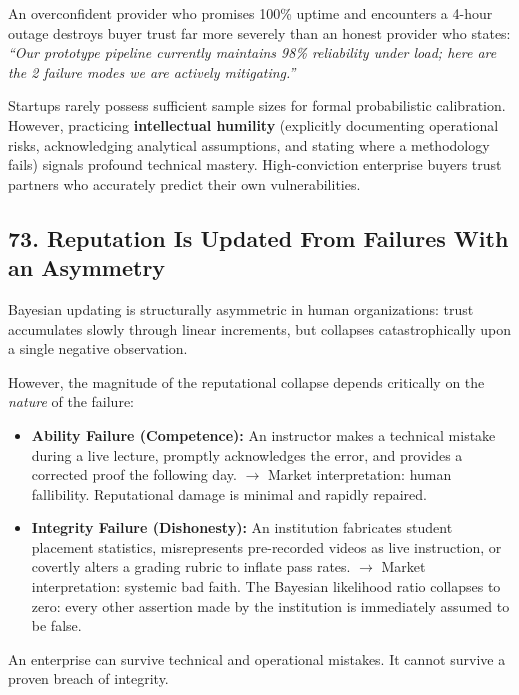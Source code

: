 An overconfident provider who promises 100\% uptime and encounters a 4-hour outage destroys buyer trust far more severely than an honest provider who states: \emph{``Our prototype pipeline currently maintains 98\% reliability under load; here are the 2 failure modes we are actively mitigating.''}

Startups rarely possess sufficient sample sizes for formal probabilistic calibration. However, practicing \textbf{intellectual humility} (explicitly documenting operational risks, acknowledging analytical assumptions, and stating where a methodology fails) signals profound technical mastery. High-conviction enterprise buyers trust partners who accurately predict their own vulnerabilities.

\subsection*{73. Reputation Is Updated From Failures With an Asymmetry}

Bayesian updating is structurally asymmetric in human organizations: trust accumulates slowly through linear increments, but collapses catastrophically upon a single negative observation. 

However, the magnitude of the reputational collapse depends critically on the \emph{nature} of the failure:
\begin{itemize}
\item \textbf{Ability Failure (Competence):} An instructor makes a technical mistake during a live lecture, promptly acknowledges the error, and provides a corrected proof the following day. $\rightarrow$ Market interpretation: human fallibility. Reputational damage is minimal and rapidly repaired.
\item \textbf{Integrity Failure (Dishonesty):} An institution fabricates student placement statistics, misrepresents pre-recorded videos as live instruction, or covertly alters a grading rubric to inflate pass rates. $\rightarrow$ Market interpretation: systemic bad faith. The Bayesian likelihood ratio collapses to zero: every other assertion made by the institution is immediately assumed to be false.
\end{itemize}

An enterprise can survive technical and operational mistakes. It cannot survive a proven breach of integrity.
